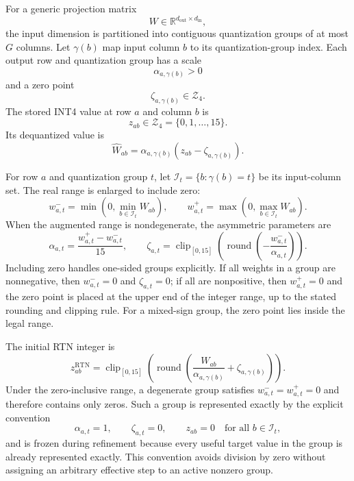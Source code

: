 For a generic projection matrix
\begin{equation}
W\in\mathbb{R}^{d_{\mathrm{out}}\times d_{\mathrm{in}}},
\end{equation}
the input dimension is partitioned into contiguous quantization groups of at most $G$ columns. Let $\gamma(b)$ map input column $b$ to its quantization-group index. Each output row and quantization group has a scale
\begin{equation}
\alpha_{a,\gamma(b)}>0
\end{equation}
and a zero point
\begin{equation}
\zeta_{a,\gamma(b)}\in\mathcal{Z}_4.
\end{equation}
The stored INT4 value at row $a$ and column $b$ is
\begin{equation}
z_{ab}\in\mathcal{Z}_4=\{0,1,\ldots,15\}.
\end{equation}
Its dequantized value is
\begin{equation}
\hat W_{ab}
=\alpha_{a,\gamma(b)}
\left(z_{ab}-\zeta_{a,\gamma(b)}\right).
\end{equation}

For row $a$ and quantization group $t$, let $\mathcal{I}_t=\{b:\gamma(b)=t\}$ be its input-column set. The real range is enlarged to include zero:
\begin{equation}
w^-_{a,t}
=
\min\left(0,\min_{b\in\mathcal{I}_t}W_{ab}\right),
\qquad
w^+_{a,t}
=
\max\left(0,\max_{b\in\mathcal{I}_t}W_{ab}\right).
\end{equation}
When the augmented range is nondegenerate, the asymmetric parameters are
\begin{equation}
\alpha_{a,t}
=
\frac{w^+_{a,t}-w^-_{a,t}}{15},
\qquad
\zeta_{a,t}
=
\operatorname{clip}_{[0,15]}
\left(
\operatorname{round}
\left(
-\frac{w^-_{a,t}}{\alpha_{a,t}}
\right)
\right).
\end{equation}
Including zero handles one-sided groups explicitly. If all weights in a group are nonnegative, then $w^-_{a,t}=0$ and $\zeta_{a,t}=0$; if all are nonpositive, then $w^+_{a,t}=0$ and the zero point is placed at the upper end of the integer range, up to the stated rounding and clipping rule. For a mixed-sign group, the zero point lies inside the legal range.

The initial RTN integer is
\begin{equation}
z_{ab}^{\mathrm{RTN}}
=\operatorname{clip}_{[0,15]}
\left(
\operatorname{round}
\left(
\frac{W_{ab}}{\alpha_{a,\gamma(b)}}+
\zeta_{a,\gamma(b)}
\right)
\right).
\end{equation}
Under the zero-inclusive range, a degenerate group satisfies $w^-_{a,t}=w^+_{a,t}=0$ and therefore contains only zeros. Such a group is represented exactly by the explicit convention
\begin{equation}
\alpha_{a,t}=1,\qquad
\zeta_{a,t}=0,\qquad
z_{ab}=0\quad\text{for all }b\in\mathcal{I}_t,
\end{equation}
and is frozen during refinement because every useful target value in the group is already represented exactly. This convention avoids division by zero without assigning an arbitrary effective step to an active nonzero group.


